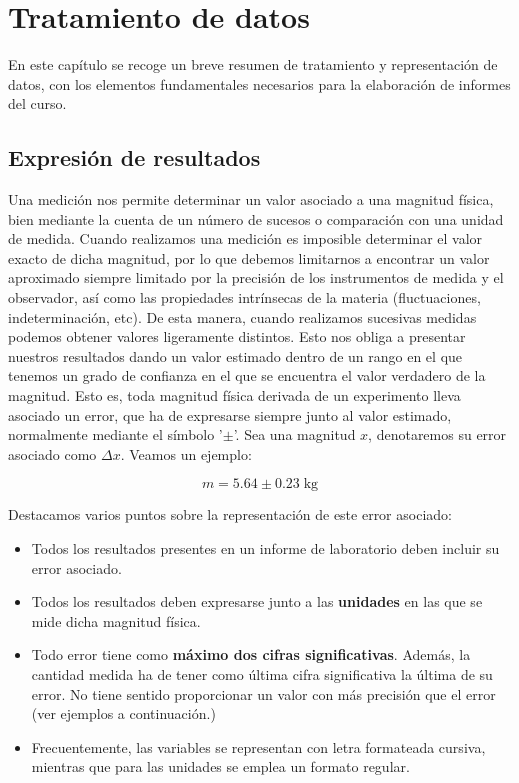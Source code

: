 \documentclass{book}
\begin{document}
\setcounter{chapter}{1}

\chapter*{Tratamiento de datos}

En este capítulo se recoge un breve resumen de tratamiento y representación de datos,
con los elementos fundamentales necesarios para la elaboración de informes del curso.

\section{Expresión de resultados}

Una medición nos permite determinar un valor asociado a una magnitud física, bien mediante
la cuenta de un número de sucesos o comparación con una unidad de medida. Cuando realizamos
una medición es imposible determinar el valor exacto de dicha magnitud, por lo que debemos
limitarnos a encontrar un valor aproximado siempre limitado por la precisión de los instrumentos
de medida y el observador, así como las propiedades intrínsecas de la materia (fluctuaciones,
indeterminación, etc). De esta manera, cuando realizamos sucesivas medidas podemos obtener valores
ligeramente distintos. Esto nos obliga a presentar nuestros resultados dando un valor estimado dentro
de un rango en el que tenemos un grado de confianza en el que se encuentra el valor verdadero de
la magnitud. Esto es, toda magnitud física derivada de un experimento lleva asociado un error, 
que ha de expresarse siempre junto al valor estimado, normalmente mediante el símbolo '$\pm$'.
Sea una magnitud $x$, denotaremos su error asociado como $\Delta x$. Veamos un ejemplo:


\begin{equation}
    m = 5.64 \pm 0.23 \; \mathrm{kg}
\end{equation}

Destacamos varios puntos sobre la representación de este error asociado:

\begin{itemize}
  \item Todos los resultados presentes en un informe de laboratorio deben incluir su error 
  asociado.
  \item Todos los resultados deben expresarse junto a las \textbf{unidades} en las que se mide dicha 
  magnitud física.
  \item Todo error tiene como \textbf{máximo dos cifras significativas}. Además, la cantidad medida
  ha de tener como última cifra significativa la última de su error. No tiene sentido proporcionar
  un valor con más precisión que el error (ver ejemplos a continuación.)
  \item Frecuentemente, las variables se representan con letra formateada cursiva, mientras 
  que para las unidades se emplea un formato regular.
\end{itemize}
\end{document}
